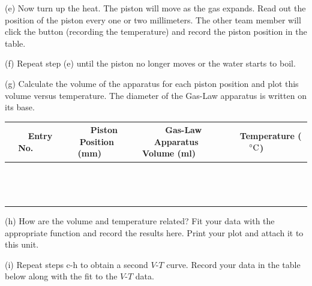 (e) Now turn up the heat. The piston will move as the gas expands.
Read out the position of the piston every one or two millimeters. The other team member
will click the  button (recording the temperature) and record the piston position
in the table.

(f) Repeat step (e) until the piston no longer moves or the water starts to boil.
 
(g) Calculate the volume of the apparatus for each piston position and plot
this volume versus temperature. The diameter of the Gas-Law apparatus is written on its
base.

\vspace{0.3cm}
{\centering \begin{tabular}{|c|c|c|c|}
\hline 
~~~Entry No.~~~&
~~~Piston Position (mm)~~~&
~~~Gas-Law Apparatus Volume (ml)~~~&
~~~Temperature ($^\circ  \rm C$)~~~\\
\hline
\hline 
&
&
&
\\
\hline 
&
&
&
\\
\hline 
&
&
&
\\
\hline 
&
&
&
\\
\hline 
&
&
&
\\
\hline 
&
&
&
\\
\hline 
&
&
&
\\
\hline 
&
&
&
\\
\hline 
&
&
&
\\
\hline
&
&
&
\\
\hline
&
&
&
\\
\hline
&
&
&
\\
\hline
&
&
&
\\
\hline
&
&
&
\\
\hline
\end{tabular}\par}
\vspace{0.3cm}

(h) How are the volume and temperature related?
Fit your data with the appropriate function and record the results here.
Print your plot and attach it to this unit.
\vspace{15mm}

\pagebreak[2]
(i) Repeat steps c-h to obtain a second $V$-$T$ curve. Record your data in the table below
along with the fit to the $V$-$T$ data.
\vspace{30mm}


